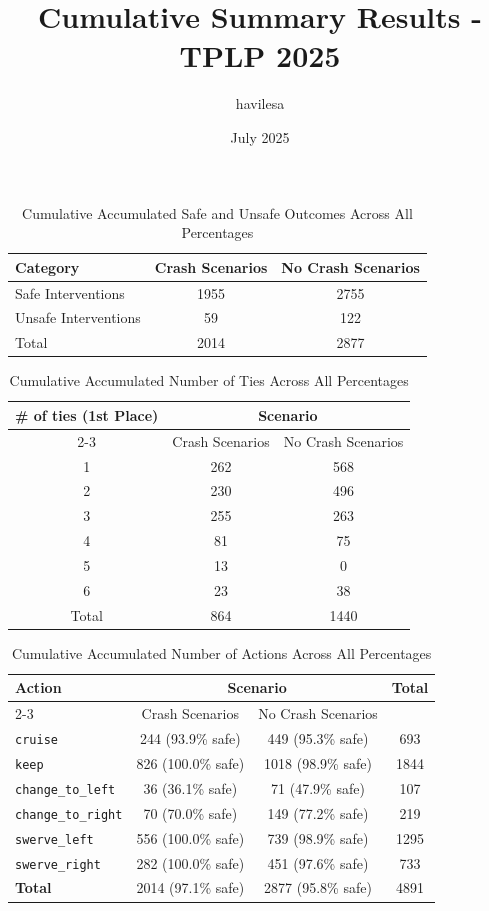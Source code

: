 \documentclass{article}
\title{Cumulative Summary Results - TPLP 2025}
\author{havilesa}
\date{July 2025}
\begin{document}
\maketitle

\begin{table}[h]
\centering
\caption{Cumulative Accumulated Safe and Unsafe Outcomes Across All Percentages}
\begin{tabular}{l|cc}
\toprule
Category & Crash Scenarios & No Crash Scenarios \\
\midrule
Safe Interventions & 1955 & 2755 \\ 
Unsafe Interventions & 59 & 122 \\ 
\midrule
Total & 2014 & 2877 \\ 
\bottomrule
\end{tabular}
\end{table}

\begin{table}[h]
\centering
\caption{Cumulative Accumulated Number of Ties Across All Percentages}
\begin{tabular}{c|cc}
\toprule
\multirow{2}{*}{\# of ties (1st Place)} & \multicolumn{2}{c|}{Scenario} \\
\cmidrule{2-3}
 & Crash Scenarios & No Crash Scenarios \\
\midrule
1 & 262 & 568 \\ 
2 & 230 & 496 \\ 
3 & 255 & 263 \\ 
4 & 81 & 75 \\ 
5 & 13 & 0 \\ 
6 & 23 & 38 \\ 
\midrule
Total & 864 & 1440 \\ 
\bottomrule
\end{tabular}
\end{table}

\begin{table}[h]
\centering
\caption{Cumulative Accumulated Number of Actions Across All Percentages}
\begin{tabular}{l|cc|c}
\toprule
\multirow{2}{*}{Action} & \multicolumn{2}{c|}{Scenario} & \multirow{2}{*}{Total} \\
\cmidrule{2-3}
 & Crash Scenarios & No Crash Scenarios \\
\midrule
\texttt{cruise} & 244 (93.9\% safe) & 449 (95.3\% safe) & 693 \\ 
\texttt{keep} & 826 (100.0\% safe) & 1018 (98.9\% safe) & 1844 \\ 
\texttt{change\_to\_left} & 36 (36.1\% safe) & 71 (47.9\% safe) & 107 \\ 
\texttt{change\_to\_right} & 70 (70.0\% safe) & 149 (77.2\% safe) & 219 \\ 
\texttt{swerve\_left} & 556 (100.0\% safe) & 739 (98.9\% safe) & 1295 \\ 
\texttt{swerve\_right} & 282 (100.0\% safe) & 451 (97.6\% safe) & 733 \\ 
\midrule
\textbf{Total} & 2014 (97.1\% safe) & 2877 (95.8\% safe) & 4891 \\ 
\bottomrule
\end{tabular}
\end{table}
\end{document}
